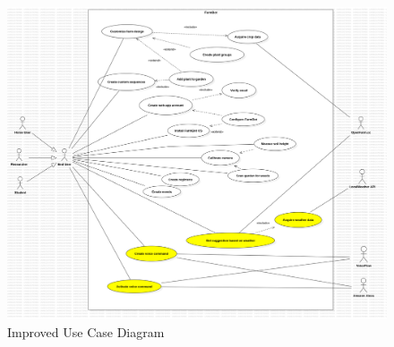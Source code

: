 \begin{figure}[H]
    \centering
    \includegraphics[width=1\textwidth]{UML Diagrams/UseCaseDiagram_suggestions.png}
    \caption{Improved Use Case Diagram}
    \label{fig:usecasediagram-suggestions}
\end{figure}

